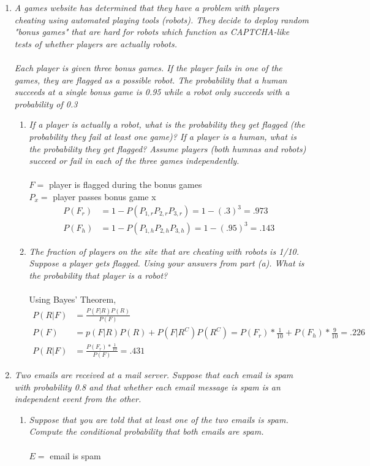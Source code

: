 \documentclass{article} %
\begin{document}
\begin{enumerate}
	\item \textit{A games website has determined that they have a problem with players cheating using automated playing tools (robots). They decide to deploy random "bonus games" that are hard for robots which function as CAPTCHA-like tests of whether players are actually robots.\\
	\\
	Each player is given three bonus games. If the player fails in one of the games, they are flagged as a possible robot. The probability that a human succeeds at a single bonus game is 0.95 while a robot only succeeds with a probability of 0.3}
	\begin{enumerate}
		\item \textit{If a player is actually a robot, what is the probability they get flagged (the probability they fail at least one game)? If a player is a human, what is the probability they get flagged? Assume players (both humnas and robots) succeed or fail in each of the three games independently.}\\
		\\
		$F =$ player is flagged during the bonus games\\
		$P_x =$ player passes bonus game x
		\begin{align*}
		P(F_r) &= 1 - P(P_{1,r}P_{2,r}P_{3,r}) = 1 - (.3)^3 = .973\\
		P(F_h) &= 1 - P(P_{1,h}P_{2,h}P_{3,h}) = 1 - (.95)^3 = .143
		\end{align*}
		
		\item \textit{The fraction of players on the site that are cheating with robots is 1/10. Suppose a player gets flagged. Using your answers from part (a). What is the probability that player is a robot?}\\
		\\
		Using Bayes' Theorem,
		\begin{align*}
		P(R | F) &= \frac{P(F | R)P(R)}{P(F)}\\
		P(F) &= p(F | R)P(R) + P(F | R^C)P(R^C) = P(F_r) * \frac{1}{10} + P(F_h) * \frac{9}{10} = .226\\
		P(R | F) &= \frac{P(F_r) * \frac{1}{10}}{P(F)} = .431
		\end{align*}
				
	\end{enumerate}
	
	\item \textit{Two emails are received at a mail server. Suppose that each email is spam with probability 0.8 and that whether each email message is spam is an independent event from the other.}
	\begin{enumerate}
		\item \textit{Suppose that you are told that at least one of the two emails is spam. Compute the conditional probability that both emails are spam.}\\
		\\
		$E =$ email is spam
		

\end{enumerate}
\end{enumerate}
\end{document}
